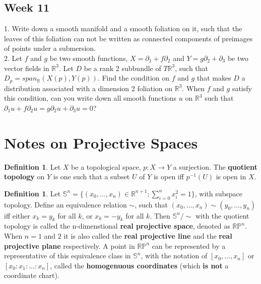 \documentclass{article}
\theoremstyle{definition}
\newtheorem{dfn}[thm]{Definition}
\begin{document}
\subsection{Week 11}

1. Write down a smooth manifold and a smooth foliation on it, such that the leaves of this foliation can not be written as connected components of preimages of points under a submersion.\\

2. Let $f$ and $g$ be two smooth functions, $X=\partial_1+f\partial_2$ and $Y=g\partial_2+\partial_3$ be two vector fields in $\mathbb{R}^3$. Let $D$ be a rank 2 subbundle of $T\mathbb{R}^3$, such that $D_p=span_{\mathbb{R}}(X(p), Y(p))$. Find the condition on $f$ and $g$ that makes $D$ a distribution associated with a dimension 2 foliation on $\mathbb{R}^3$. When $f$ and $g$ satisfy this condition, can you write down all smooth functions $u$ on $\mathbb{R}^3$ such that $\partial_1 u+f\partial_2 u=g\partial_2 u+\partial_3u=0$?


\newpage

\section{Notes on Projective Spaces}

\begin{dfn}
    Let $X$ be a topological space, $p: X\rightarrow Y$ a surjection. The {\bf quotient topology} on $Y$ is one such that a subset $U$ of $Y$ is open iff $p^{-1}(U)$ is open in $X$.
\end{dfn}

\begin{dfn}
    Let $\mathbb{S}^n=\{(x_0, \dots, x_n)\in\mathbb{R}^{n+1}: \sum_{i=0}^n x_i^2=1\}$, with subspace topology. Define an equivalence relation $\sim$, such that $(x_0, \dots, x_n)\sim (y_0, \dots, y_n)$ iff either $x_k=y_k$ for all $k$, or $x_k=-y_k$ for all $k$. Then $\mathbb{S}^n/\sim$ with the quotient topology is called the n-dimenstional {\bf real projective space}, denoted as $\mathbb{RP}^n$. When $n=1$ and $2$ it is also called the {\bf real projective line} and the {\bf real projective plane} respectively. A point in $\mathbb{RP}^n$ can be represented by a representative of this equivalence class in $\mathbb{S}^n$, with the notation of $[x_0, \dots, x_n]$ or $[x_0:x_1:\dots:x_n]$, called the {\bf homogenuous coordinates} (which {\bf is not} a coordinate chart). 
\end{dfn}
\end{document}
